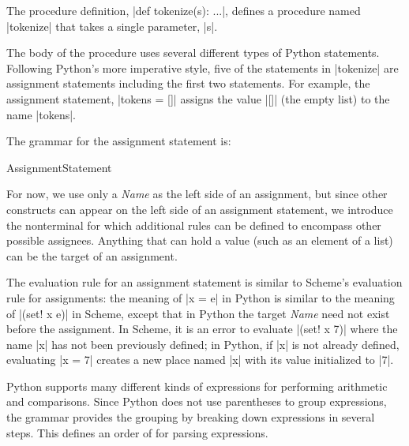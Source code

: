 The procedure definition, \pycode|def tokenize(s): ...|, defines a procedure named \pycode|tokenize| that takes a single parameter, \pycode|s|.  

 The body of the procedure uses several different types of Python statements.  Following Python's more imperative style, five of the statements in \pycode|tokenize| are assignment statements including the first two statements.  For example, the assignment statement, \pycode|tokens = []| assigns the value \pycode|[]| (the empty list) to the name \pycode|tokens|.

The grammar for the assignment statement is:
\begin{bnfgrammarm}{AssignmentStatement}
\end{bnfgrammarm}
For now, we use only a \emph{Name} as the left side of an assignment, but since other constructs can appear on the left side of an assignment statement, we introduce the nonterminal  for which additional rules can be defined to encompass other possible assignees.  Anything that can hold a value (such as an element of a list) can be the target of an assignment.

The evaluation rule for an assignment statement is similar to Scheme's evaluation rule for assignments: the meaning of \pycode|x = e| in Python is similar to the meaning of \scheme|(set! x e)| in Scheme, except that in Python the target \emph{Name} need not exist before the assignment.  In Scheme, it is an error to evaluate \scheme|(set! x 7)| where the name \scheme|x| has not been previously defined; in Python, if \pycode|x| is not already defined, evaluating \pycode|x = 7| creates a new place named \pycode|x| with its value initialized to \pycode|7|.


  Python supports many different kinds of expressions for performing arithmetic and comparisons.  Since Python does not use parentheses to group expressions, the grammar provides the grouping by breaking down expressions in several steps.  This defines an order of  for parsing expressions. 

